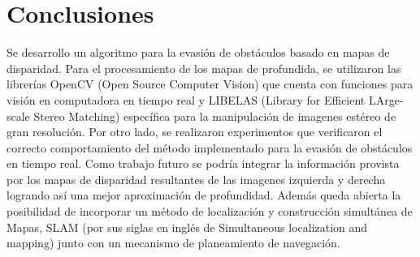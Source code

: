 \documentclass[journal]{IEEEtran}
\begin{document}
\section{Conclusiones}
\label{sec:conclusiones}
Se desarrollo un algoritmo para la evasi\'on de obst\'aculos basado en mapas de disparidad. Para el procesamiento de los mapas de profundida, se utilizaron las librer\'ias OpenCV (Open Source Computer Vision) que cuenta con funciones para visi\'on en computadora en tiempo real y LIBELAS (Library for Efficient LArge-scale Stereo Matching) espec\'ifica para la manipulaci\'on de imagenes est\'ereo de gran resoluci\'on. Por otro lado, se realizaron experimentos que verificaron el correcto comportamiento del m\'etodo implementado para la evasi\'on de obst\'aculos en tiempo real. Como trabajo futuro se podr\'ia integrar la informaci\'on provista por los mapas de disparidad resultantes de las imagenes izquierda y derecha logrando as\'i una mejor aproximaci\'on de profundidad. Adem\'as queda abierta la posibilidad de incorporar un m\'etodo de localizaci\'on y construcci\'on simult\'anea de Mapas, SLAM (por sus siglas en ingl\'es de Simultaneous localization and mapping) junto con un mecanismo de planeamiento de navegaci\'on.





\nocite{KNG10}
\nocite{G10}
\nocite{opencv}
\nocite{B00}
\nocite{H04}
\nocite{DPSC09}
\nocite{RH04}




%
%

\end{document}
